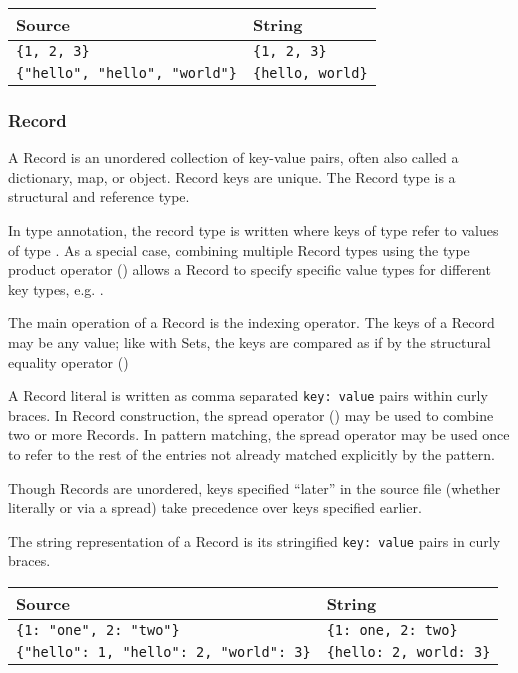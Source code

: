 \begin{table}[H]
    \centering
    \begin{tabular}{ll}
        \hline
        \textbf{Source} & \textbf{String} \\
        \hline
        \texttt{\{1, 2, 3\}} & \texttt{\{1, 2, 3\}} \\
        \texttt{\{"hello", "hello", "world"\}} & \texttt{\{hello, world\}} \\
        \hline
    \end{tabular}
\end{table}

\subsubsection{Record}

A Record is an unordered collection of key-value pairs, often also called
a dictionary, map, or object. Record keys are unique. The Record type is a
structural and reference type.

In type annotation, the record type is written  where keys of
type  refer to values of type . As a special case, combining
multiple Record types using the type product operator (\op{\&}) allows a Record
to specify specific value types for different key types, e.g.
.

The main operation of a Record is the indexing operator. The keys of a
Record may be any value; like with Sets, the keys are compared as if by
the structural equality operator (\op{==})

A Record literal is written as comma separated \texttt{key: value} pairs
within curly braces. In Record construction, the spread operator ()
may be used to combine two or more Records. In pattern matching, the spread
operator may be used once to refer to the rest of the entries not already
matched explicitly by the pattern.

Though Records are unordered, keys specified ``later'' in the source file
(whether literally or via a spread) take precedence over keys specified
earlier.

The string representation of a Record is its stringified \texttt{key: value}
pairs in curly braces.

\begin{table}[H]
    \centering
    \begin{tabular}{ll}
        \hline
        \textbf{Source} & \textbf{String} \\
        \hline
        \texttt{\{1: "one", 2: "two"\}} & \texttt{\{1: one, 2: two\}} \\
        \texttt{\{"hello": 1, "hello": 2, "world": 3\}} & \texttt{\{hello: 2, world: 3\}} \\
        \hline
    \end{tabular}
\end{table}

